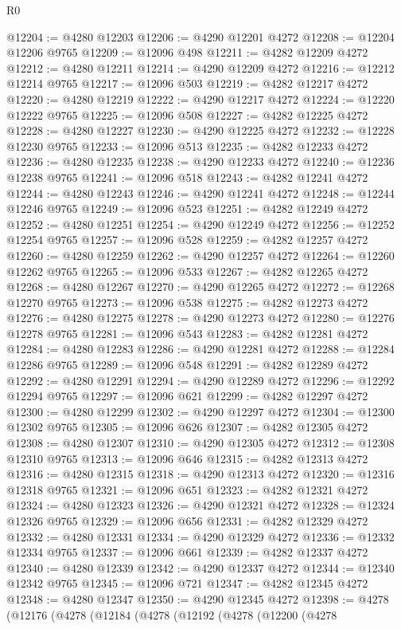 \begin{lexlean}{R0}
\begin{coremodule}
@12204 := @4280 @12203
@12206 := @4290 @12201 @4272
@12208 := @12204 @12206 @9765
@12209 := @12096 @498
@12211 := @4282 @12209 @4272
@12212 := @4280 @12211
@12214 := @4290 @12209 @4272
@12216 := @12212 @12214 @9765
@12217 := @12096 @503
@12219 := @4282 @12217 @4272
@12220 := @4280 @12219
@12222 := @4290 @12217 @4272
@12224 := @12220 @12222 @9765
@12225 := @12096 @508
@12227 := @4282 @12225 @4272
@12228 := @4280 @12227
@12230 := @4290 @12225 @4272
@12232 := @12228 @12230 @9765
@12233 := @12096 @513
@12235 := @4282 @12233 @4272
@12236 := @4280 @12235
@12238 := @4290 @12233 @4272
@12240 := @12236 @12238 @9765
@12241 := @12096 @518
@12243 := @4282 @12241 @4272
@12244 := @4280 @12243
@12246 := @4290 @12241 @4272
@12248 := @12244 @12246 @9765
@12249 := @12096 @523
@12251 := @4282 @12249 @4272
@12252 := @4280 @12251
@12254 := @4290 @12249 @4272
@12256 := @12252 @12254 @9765
@12257 := @12096 @528
@12259 := @4282 @12257 @4272
@12260 := @4280 @12259
@12262 := @4290 @12257 @4272
@12264 := @12260 @12262 @9765
@12265 := @12096 @533
@12267 := @4282 @12265 @4272
@12268 := @4280 @12267
@12270 := @4290 @12265 @4272
@12272 := @12268 @12270 @9765
@12273 := @12096 @538
@12275 := @4282 @12273 @4272
@12276 := @4280 @12275
@12278 := @4290 @12273 @4272
@12280 := @12276 @12278 @9765
@12281 := @12096 @543
@12283 := @4282 @12281 @4272
@12284 := @4280 @12283
@12286 := @4290 @12281 @4272
@12288 := @12284 @12286 @9765
@12289 := @12096 @548
@12291 := @4282 @12289 @4272
@12292 := @4280 @12291
@12294 := @4290 @12289 @4272
@12296 := @12292 @12294 @9765
@12297 := @12096 @621
@12299 := @4282 @12297 @4272
@12300 := @4280 @12299
@12302 := @4290 @12297 @4272
@12304 := @12300 @12302 @9765
@12305 := @12096 @626
@12307 := @4282 @12305 @4272
@12308 := @4280 @12307
@12310 := @4290 @12305 @4272
@12312 := @12308 @12310 @9765
@12313 := @12096 @646
@12315 := @4282 @12313 @4272
@12316 := @4280 @12315
@12318 := @4290 @12313 @4272
@12320 := @12316 @12318 @9765
@12321 := @12096 @651
@12323 := @4282 @12321 @4272
@12324 := @4280 @12323
@12326 := @4290 @12321 @4272
@12328 := @12324 @12326 @9765
@12329 := @12096 @656
@12331 := @4282 @12329 @4272
@12332 := @4280 @12331
@12334 := @4290 @12329 @4272
@12336 := @12332 @12334 @9765
@12337 := @12096 @661
@12339 := @4282 @12337 @4272
@12340 := @4280 @12339
@12342 := @4290 @12337 @4272
@12344 := @12340 @12342 @9765
@12345 := @12096 @721
@12347 := @4282 @12345 @4272
@12348 := @4280 @12347
@12350 := @4290 @12345 @4272
@12398 := @4278
    (@12176
      (@4278
        (@12184
          (@4278
            (@12192
              (@4278
                (@12200
                  (@4278

\end{coremodule}
\end{lexlean}
